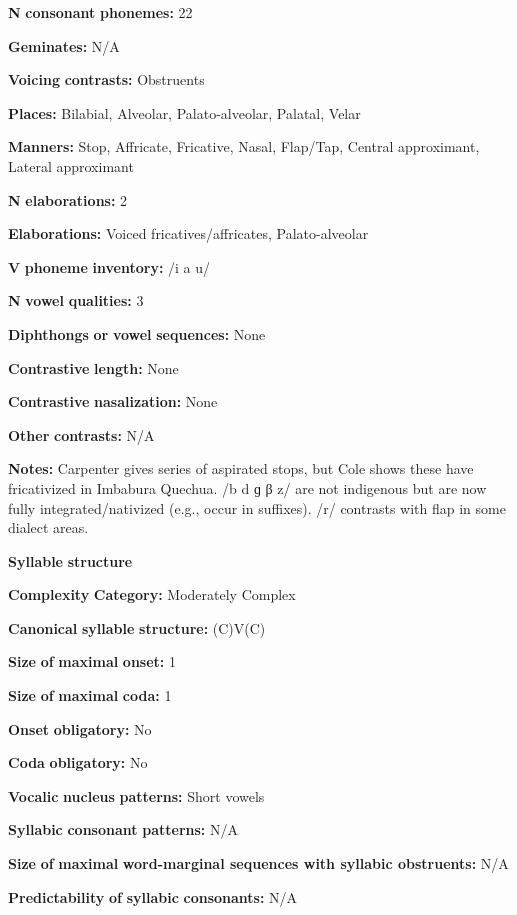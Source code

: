 \textbf{N} \textbf{consonant} \textbf{phonemes:} 22

\textbf{Geminates:} N/A

\textbf{Voicing} \textbf{contrasts:} Obstruents

\textbf{Places:} Bilabial, Alveolar, Palato-alveolar, Palatal, Velar

\textbf{Manners:} Stop, Affricate, Fricative, Nasal, Flap/Tap, Central approximant, Lateral approximant

\textbf{N} \textbf{elaborations:} 2

\textbf{Elaborations:} Voiced fricatives/affricates, Palato-alveolar

\textbf{V} \textbf{phoneme} \textbf{inventory:} /i a u/

\textbf{N} \textbf{vowel} \textbf{qualities:} 3

\textbf{Diphthongs} \textbf{or} \textbf{vowel} \textbf{sequences:} None

\textbf{Contrastive} \textbf{length:} None

\textbf{Contrastive} \textbf{nasalization:} None

\textbf{Other} \textbf{contrasts:} N/A

\textbf{Notes:} Carpenter gives series of aspirated stops, but Cole shows these have fricativized in Imbabura Quechua. /b d ɡ β z/ are not indigenous but are now fully integrated/nativized (e.g., occur in suffixes). /r/ contrasts with flap in some dialect areas.

\textbf{Syllable} \textbf{structure}

\textbf{Complexity} \textbf{Category:} Moderately Complex

\textbf{Canonical} \textbf{syllable} \textbf{structure:} (C)V(C) \citep[203-5]{Cole1982}

\textbf{Size} \textbf{of} \textbf{maximal} \textbf{onset:} 1

\textbf{Size} \textbf{of} \textbf{maximal} \textbf{coda:} 1

\textbf{Onset} \textbf{obligatory:} No

\textbf{Coda} \textbf{obligatory:} No

\textbf{Vocalic} \textbf{nucleus} \textbf{patterns:} Short vowels

\textbf{Syllabic} \textbf{consonant} \textbf{patterns:} N/A

\textbf{Size} \textbf{of} \textbf{maximal} \textbf{word{}-marginal sequences with syllabic obstruents:} N/A

\textbf{Predictability} \textbf{of} \textbf{syllabic} \textbf{consonants:} N/A


